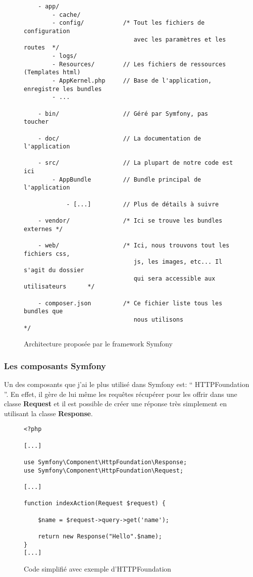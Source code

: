 \begin{figure}[H]
\begin{lstlisting}
    - app/
        - cache/
        - config/           /* Tout les fichiers de configuration
                               avec les paramètres et les routes  */
        - logs/
        - Resources/        // Les fichiers de ressources (Templates html)
        - AppKernel.php     // Base de l'application, enregistre les bundles
        - ...

    - bin/                  // Géré par Symfony, pas toucher

    - doc/                  // La documentation de l'application

    - src/                  // La plupart de notre code est ici
        - AppBundle         // Bundle principal de l'application

            - [...]         // Plus de détails à suivre

    - vendor/               /* Ici se trouve les bundles externes */

    - web/                  /* Ici, nous trouvons tout les fichiers css,
                               js, les images, etc... Il s'agit du dossier
                               qui sera accessible aux utilisateurs      */

    - composer.json         /* Ce fichier liste tous les bundles que 
                               nous utilisons                       */
\end{lstlisting}
\caption{Architecture proposée par le framework Symfony}
\end{figure}

\subsubsection*{Les composants Symfony}

Un des composants que j'ai le plus utilisé dans Symfony est: `` HTTPFoundation ''. En effet, il gère de lui même les requêtes récupérer pour les offrir dans une classe \textbf{Request} et il est possible de créer une réponse très simplement en utilisant la classe \textbf{Response}.

\begin{figure}[H]
\begin{lstlisting}[frame=single]
<?php

[...]

use Symfony\Component\HttpFoundation\Response;
use Symfony\Component\HttpFoundation\Request;

[...]

function indexAction(Request $request) {

    $name = $request->query->get('name');

    return new Response("Hello".$name);
}
[...]

\end{lstlisting}
\caption{Code simplifié avec exemple d'HTTPFoundation}
\end{figure}

